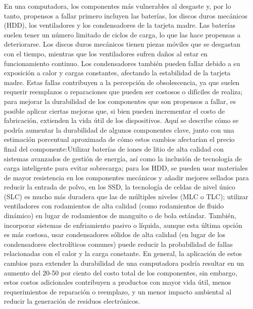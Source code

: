 \documentclass[10pt,journal,compsoc]{IEEEtran}
\begin{document}
En una computadora, los componentes más vulnerables al desgaste y, por lo tanto, propensos a fallar primero incluyen las baterías, los discos duros mecánicos (HDD), los ventiladores y los condensadores de la tarjeta madre. Las baterías suelen tener un número limitado de ciclos de carga, lo que las hace propensas a deteriorarse. Los discos duros mecánicos tienen piezas móviles que se desgastan con el tiempo, mientras que los ventiladores sufren daños al estar en funcionamiento continuo. Los condensadores también pueden fallar debido a su exposición a calor y cargas constantes, afectando la estabilidad de la tarjeta madre. Estas fallas contribuyen a la percepción de obsolescencia, ya que suelen requerir reemplazos o reparaciones que pueden ser costosos o difíciles de realiza; para mejorar la durabilidad de los componentes que son propensos a fallar, es posible aplicar ciertas mejoras que, si bien pueden incrementar el costo de fabricación, extienden la vida útil de los dispositivos. Aquí se describe cómo se podría aumentar la durabilidad de algunos componentes clave, junto con una estimación porcentual aproximada de cómo estos cambios afectarían el precio final del componente:Utilizar baterías de iones de litio de alta calidad con sistemas avanzados de gestión de energía, así como la inclusión de tecnología de carga inteligente para evitar sobrecarga; para los HDD, se pueden usar materiales de mayor resistencia en los componentes mecánicos y añadir mejores sellados para reducir la entrada de polvo, en los SSD, la tecnología de celdas de nivel único (SLC) es mucho más duradera que las de múltiples niveles (MLC o TLC); utilizar ventiladores con rodamientos de alta calidad (como rodamientos de fluido dinámico) en lugar de rodamientos de manguito o de bola estándar. También, incorporar sistemas de enfriamiento pasivo o líquida, aunque esta última opción es más costosa, usar condensadores sólidos de alta calidad (en lugar de los condensadores electrolíticos comunes) puede reducir la probabilidad de fallas relacionadas con el calor y la carga constante. En general, la aplicación de estos cambios para extender la durabilidad de una computadora podría resultar en un aumento del 20-50 por ciento del costo total de los componentes, sin embargo, estos costos adicionales contribuyen a productos con mayor vida útil, menos requerimientos de reparación o reemplazo, y un menor impacto ambiental al reducir la generación de residuos electrónicos.
\end{document}
